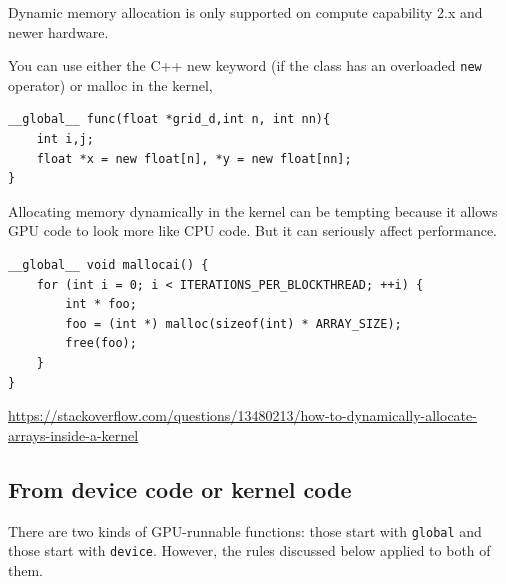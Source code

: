 Dynamic memory allocation is only supported on compute capability 2.x and newer hardware.

You can use either the C++ new keyword (if the class has an overloaded
\verb!new! operator) or malloc in the kernel,

\begin{lstlisting}
__global__ func(float *grid_d,int n, int nn){  
    int i,j;  
    float *x = new float[n], *y = new float[nn];   
}
\end{lstlisting}

Allocating memory dynamically in the kernel can be tempting because it allows
GPU code to look more like CPU code. But it can seriously affect performance.
\begin{lstlisting}
__global__ void mallocai() {
    for (int i = 0; i < ITERATIONS_PER_BLOCKTHREAD; ++i) {
        int * foo;
        foo = (int *) malloc(sizeof(int) * ARRAY_SIZE);
        free(foo);
    }
}
\end{lstlisting}

\url{https://stackoverflow.com/questions/13480213/how-to-dynamically-allocate-arrays-inside-a-kernel}

\subsection{From device code or kernel code}
\label{sec:kernel}

There are two kinds of GPU-runnable functions: those start with \verb!global!
and those start with \verb!device!. However, the rules discussed below applied
to both of them.

